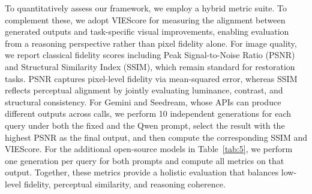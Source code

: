 To quantitatively assess our framework, we employ a hybrid metric suite. To complement these, we adopt VIEScore for measuring the alignment between generated outputs and task-specific visual improvements, enabling evaluation from a reasoning perspective rather than pixel fidelity alone. For image quality, we report classical fidelity scores including Peak Signal-to-Noise Ratio (PSNR) and Structural Similarity Index (SSIM), which remain standard for restoration tasks. PSNR captures pixel-level fidelity via mean-squared error, whereas SSIM reflects perceptual alignment by jointly evaluating luminance, contrast, and structural consistency.
For Gemini and Seedream, whose APIs can produce different outputs across calls, we perform 10 independent generations for each query under both the fixed and the Qwen prompt, select the result with the highest PSNR as the final output, and then compute the corresponding SSIM and VIEScore. For the additional open-source models in Table~\ref{tab:5}, we perform one generation per query for both prompts and compute all metrics on that output. Together, these metrics provide a holistic evaluation that balances low-level fidelity, perceptual similarity, and reasoning coherence.


